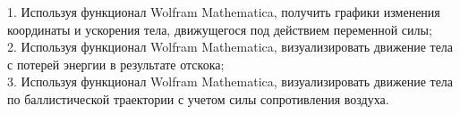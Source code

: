 1. Используя функционал Wolfram Mathematica, получить графики изменения координаты и ускорения тела, движущегося под действием переменной силы;\\


2. Используя функционал Wolfram Mathematica, визуализировать движение тела с потерей энергии в результате отскока;\\


3. Используя функционал Wolfram Mathematica, визуализировать движение тела по баллистической траектории с учетом силы сопротивления воздуха.

